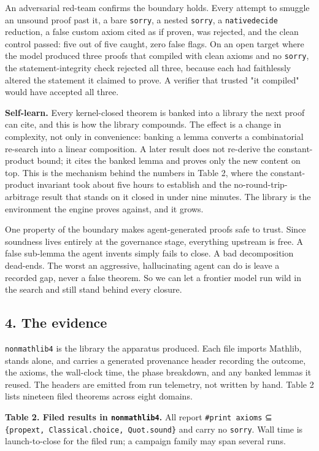 \documentclass[
  11pt,
]{article}
\renewcommand{\_}{\origunderscore\allowbreak}
\begin{document}
An adversarial red-team confirms the boundary holds. Every attempt to
smuggle an unsound proof past it, a bare \texttt{sorry}, a nested
\texttt{sorry}, a \texttt{native\_decide} reduction, a false custom
axiom cited as if proven, was rejected, and the clean control passed:
five out of five caught, zero false flags. On an open target where the
model produced three proofs that compiled with clean axioms and no
\texttt{sorry}, the statement-integrity check rejected all three,
because each had faithlessly altered the statement it claimed to prove.
A verifier that trusted "it compiled" would have accepted all three.

\textbf{Self-learn.} Every kernel-closed theorem is banked into a
library the next proof can cite, and this is how the library compounds.
The effect is a change in complexity, not only in convenience: banking a
lemma converts a combinatorial re-search into a linear composition. A
later result does not re-derive the constant-product bound; it cites the
banked lemma and proves only the new content on top. This is the
mechanism behind the numbers in Table 2, where the constant-product
invariant took about five hours to establish and the
no-round-trip-arbitrage result that stands on it closed in under nine
minutes. The library is the environment the engine proves against, and
it grows.

One property of the boundary makes agent-generated proofs safe to trust.
Since soundness lives entirely at the governance stage, everything
upstream is free. A false sub-lemma the agent invents simply fails to
close. A bad decomposition dead-ends. The worst an aggressive,
hallucinating agent can do is leave a recorded gap, never a false
theorem. So we can let a frontier model run wild in the search and still
stand behind every closure.

\subsection{4. The evidence}\label{4-the-evidence}

\texttt{nonmathlib4} is the library the apparatus produced. Each file
imports Mathlib, stands alone, and carries a generated provenance header
recording the outcome, the axioms, the wall-clock time, the phase
breakdown, and any banked lemmas it reused. The headers are emitted from
run telemetry, not written by hand. Table 2 lists nineteen filed
theorems across eight domains.

\textbf{Table 2. Filed results in \texttt{nonmathlib4}.} All report
\texttt{\#print\ axioms} ⊆
\texttt{\{propext,\ Classical.choice,\ Quot.sound\}} and carry no
\texttt{sorry}. Wall time is launch-to-close for the filed run; a
campaign family may span several runs.
\end{document}
